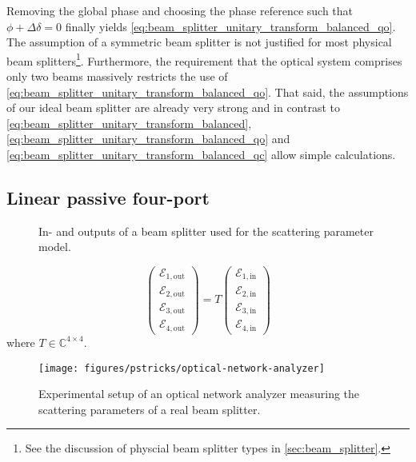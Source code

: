 Removing the global phase and choosing the phase reference such that $\phi+\Delta\delta=0$ finally yields \cref{eq:beam_splitter_unitary_transform_balanced_qo}.
The assumption of a symmetric beam splitter is not justified for most physical beam splitters\footnote{See the discussion of physcial beam splitter types in \cref{sec:beam_splitter}.}.
Furthermore, the requirement that the optical system comprises only two beams massively restricts the use of \cref{eq:beam_splitter_unitary_transform_balanced_qo}.
That said, the assumptions of our ideal beam splitter are already very strong and in contrast to \cref{eq:beam_splitter_unitary_transform_balanced}, \cref{eq:beam_splitter_unitary_transform_balanced_qo} and \cref{eq:beam_splitter_unitary_transform_balanced_qc} allow simple calculations.

\FloatBarrier
\subsection{Linear passive four-port}
\begin{figure}[htb]
    \centering
    
    \caption{In- and outputs of a beam splitter used for the scattering parameter model.}\label{fig:beam_splitter_scattering_parameters}
\end{figure}

\begin{equation}
    \begin{pmatrix}
        \mathcal{E}_{1,\text{out}} \\
        \mathcal{E}_{2,\text{out}} \\
        \mathcal{E}_{3,\text{out}} \\
        \mathcal{E}_{4,\text{out}}
    \end{pmatrix}
    =
    T
    \begin{pmatrix}
        \mathcal{E}_{1,\text{in}} \\
        \mathcal{E}_{2,\text{in}} \\
        \mathcal{E}_{3,\text{in}} \\
        \mathcal{E}_{4,\text{in}}
    \end{pmatrix}
\end{equation}
where $T\in\mathbb{C}^{4\times4}$.

\begin{figure}[htb]
    \centering
    \texttt{[image: figures/pstricks/optical-network-analyzer]}
    \caption{Experimental setup of an optical network analyzer measuring the scattering parameters of a real beam splitter.}\label{fig:beam_splitter_network_analyzer}
\end{figure}

